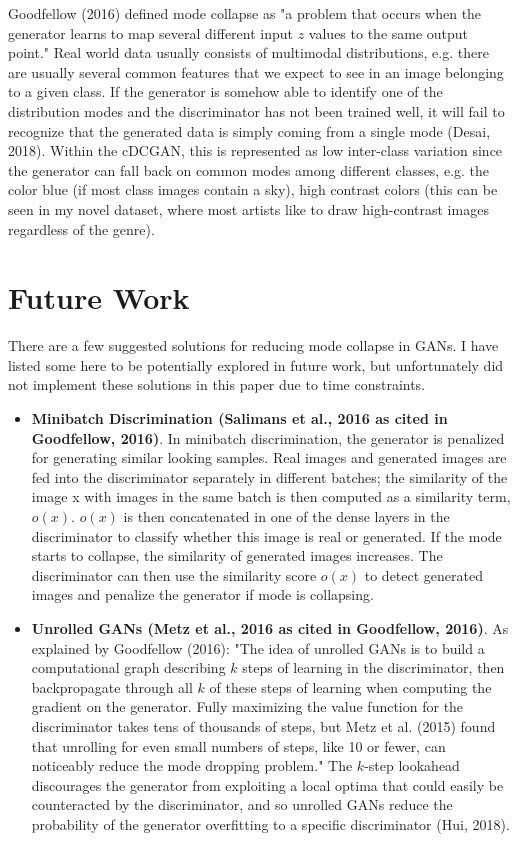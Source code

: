 \documentclass[11pt]{article}
\begin{document}
Goodfellow (2016) defined mode collapse as "a problem that occurs when
the generator learns to map several different input \(z\) values to the
same output point." Real world data usually consists of multimodal
distributions, e.g. there are usually several common features that we
expect to see in an image belonging to a given class. If the generator
is somehow able to identify one of the distribution modes and the
discriminator has not been trained well, it will fail to recognize that
the generated data is simply coming from a single mode (Desai, 2018).
Within the cDCGAN, this is represented as low inter-class variation
since the generator can fall back on common modes among different
classes, e.g. the color blue (if most class images contain a sky), high
contrast colors (this can be seen in my novel dataset, where most
artists like to draw high-contrast images regardless of the genre).

\section{Future Work}\label{future-work}

There are a few suggested solutions for reducing mode collapse in GANs.
I have listed some here to be potentially explored in future work, but
unfortunately did not implement these solutions in this paper due to
time constraints.

\begin{itemize}
\item
  \textbf{Minibatch Discrimination (Salimans et al., 2016 as cited in
  Goodfellow, 2016)}. In minibatch discrimination, the generator is
  penalized for generating similar looking samples. Real images and
  generated images are fed into the discriminator separately in
  different batches; the similarity of the image x with images in the
  same batch is then computed as a similarity term, \(o(x)\). \(o(x)\)
  is then concatenated in one of the dense layers in the discriminator
  to classify whether this image is real or generated. If the mode
  starts to collapse, the similarity of generated images increases. The
  discriminator can then use the similarity score \(o(x)\) to detect
  generated images and penalize the generator if mode is collapsing.
\item

  \textbf{Unrolled GANs (Metz et al., 2016 as cited in Goodfellow,
  2016)}. As explained by Goodfellow (2016): "The idea of unrolled GANs
  is to build a computational graph describing \(k\) steps of learning
  in the discriminator, then backpropagate through all \(k\) of these
  steps of learning when computing the gradient on the generator. Fully
  maximizing the value function for the discriminator takes tens of
  thousands of steps, but Metz et al. (2015) found that unrolling for even small numbers of steps, like 10 or
  fewer, can noticeably reduce the mode dropping problem." The
  \(k\)-step lookahead discourages the generator from exploiting a local
  optima that could easily be counteracted by the discriminator, and so
  unrolled GANs reduce the probability of the generator overfitting to a
  specific discriminator (Hui, 2018).
\end{itemize}
\end{document}
